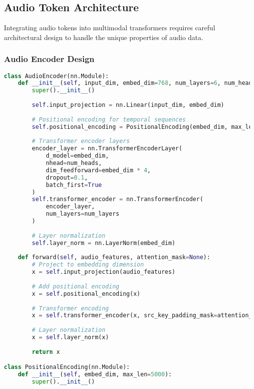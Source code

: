 \subsection{Audio Token Architecture}

Integrating audio tokens into multimodal transformers requires careful architectural design to handle the unique properties of audio data.

\subsubsection{Audio Encoder Design}

\begin{lstlisting}[language=Python, caption=Audio encoder for generating audio tokens]
class AudioEncoder(nn.Module):
    def __init__(self, input_dim, embed_dim=768, num_layers=6, num_heads=8):
        super().__init__()
        
        self.input_projection = nn.Linear(input_dim, embed_dim)
        
        # Positional encoding for temporal sequences
        self.positional_encoding = PositionalEncoding(embed_dim, max_len=2000)
        
        # Transformer encoder layers
        encoder_layer = nn.TransformerEncoderLayer(
            d_model=embed_dim,
            nhead=num_heads,
            dim_feedforward=embed_dim * 4,
            dropout=0.1,
            batch_first=True
        )
        self.transformer_encoder = nn.TransformerEncoder(
            encoder_layer, 
            num_layers=num_layers
        )
        
        # Layer normalization
        self.layer_norm = nn.LayerNorm(embed_dim)
        
    def forward(self, audio_features, attention_mask=None):
        # Project to embedding dimension
        x = self.input_projection(audio_features)
        
        # Add positional encoding
        x = self.positional_encoding(x)
        
        # Transformer encoding
        x = self.transformer_encoder(x, src_key_padding_mask=attention_mask)
        
        # Layer normalization
        x = self.layer_norm(x)
        
        return x

class PositionalEncoding(nn.Module):
    def __init__(self, embed_dim, max_len=5000):
        super().__init__()
        

\end{lstlisting}

